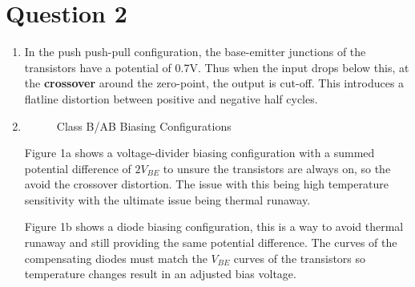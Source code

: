 \documentclass[11pt]{article}
\begin{document}
  \newpage
  \section*{Question 2}
  \begin{enumerate}[label=\alph*)]
    \item %
    In the push push-pull configuration, the base-emitter junctions of the transistors have a potential of 0.7V. Thus when the input drops below this, at the \textbf{crossover} around the zero-point, the output is cut-off. This introduces a flatline distortion between positive and negative half cycles.
    
    \item %
   
    \begin{figure}[h]
      \centering
              \hspace{0.15\linewidth}
      \caption{Class B/AB Biasing Configurations}
      \label{fig_graph} 
    \end{figure} 

    Figure 1a shows a voltage-divider biasing configuration with a summed potential difference of $2V_{BE}$ to unsure the transistors are always on, so the avoid the crossover distortion. The issue with this being high temperature sensitivity with the ultimate issue being thermal runaway. 

    Figure 1b shows a diode biasing configuration, this is a way to avoid thermal runaway and still providing the same potential difference. The curves of the compensating diodes must match the $V_{BE}$ curves of the transistors so temperature changes result in an adjusted bias voltage.


  \end{enumerate}
  
\end{document}
